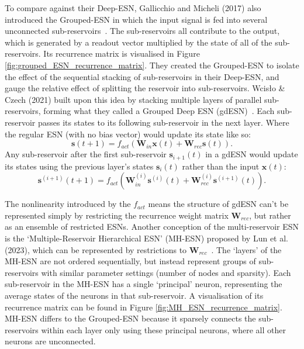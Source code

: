 To compare against their Deep-ESN, Gallicchio and Micheli (2017) also introduced the Grouped-ESN in which the input signal is fed into several unconnected sub-reservoirs~\cite{gallicchio_and_micheli_2017}. The sub-reservoirs all contribute to the output, which is generated by a readout vector multiplied by the state of all of the sub-reservoirs. Its recurrence matrix is visualised in Figure \ref{fig:grouped_ESN_recurrence_matrix}. They created the Grouped-ESN to isolate the effect of the sequential stacking of sub-reservoirs in their Deep-ESN, and gauge the relative effect of splitting the reservoir into sub-reservoirs. Wcisło \& Czech (2021) built upon this idea by stacking multiple layers of parallel sub-reservoirs, forming what they called a Grouped Deep ESN (gdESN)~\cite{wcislo_2021}. Each sub-reservoir passes its states to its following sub-reservoir in the next layer. Where the regular ESN (with no bias vector) would update its state like so:
\[
    \mathbf{s}(t + 1) = f_{act}(\mathbf{W}_{in}\mathbf{x}(t) + \mathbf{W}_{rec}\mathbf{s}(t)).
\]
Any sub-reservoir after the first sub-reservoir $\mathbf{s}_{i + 1}(t)$ in a gdESN would update its states using the previous layer's states $\mathbf{s}_i(t)$ rather than the input $\mathbf{x}(t)$:
\[
    \mathbf{s}^{(i + 1)}(t + 1) = f_{act}(\mathbf{W}^{(i)}_{in}\mathbf{s}^{(i)}(t) + \mathbf{W}^{(i)}_{rec}\mathbf{s}^{(i + 1)}(t)).
\]

The nonlinearity introduced by the $f_{act}$ means the structure of gdESN can't be represented simply by restricting the recurrence weight matrix $\mathbf{W}_{rec}$, but rather as an ensemble of restricted ESNs. Another conception of the multi-reservoir ESN is the `Multiple-Reservoir Hierarchical ESN' (MH-ESN) proposed by Lun et al. (2023), which can be represented by restrictions to $\mathbf{W}_{rec}$~\cite{lun_2023}. The `layers' of the MH-ESN are not ordered sequentially, but instead represent groups of sub-reservoirs with similar parameter settings (number of nodes and sparsity). Each sub-reservoir in the MH-ESN has a single `principal' neuron, representing the average states of the neurons in that sub-reservoir. A visualisation of its recurrence matrix can be found in Figure \ref{fig:MH_ESN_recurrence_matrix}. MH-ESN differs to the Grouped-ESN because it sparsely connects the sub-reservoirs within each layer only using these principal neurons, where all other neurons are unconnected.

